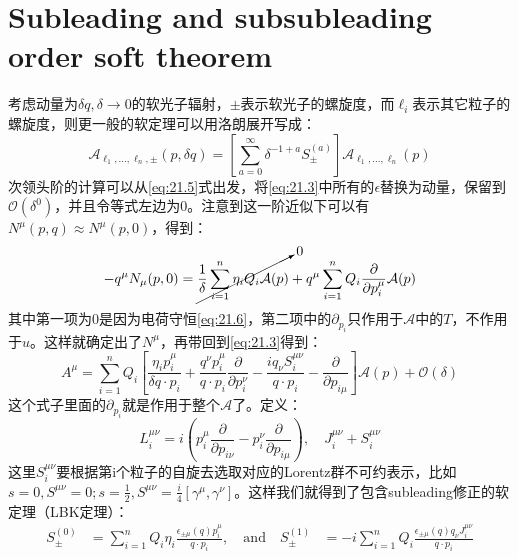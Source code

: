 \section{Subleading and subsubleading order soft theorem}
考虑动量为$\delta q,\delta \to0$的软光子辐射，$\pm$表示软光子的螺旋度，而$\ell_i$表示其它粒子的螺旋度，则更一般的软定理可以用洛朗展开写成：
\begin{equation}
	\mathcal{A}_{\ell_1,...,\ell_n,\pm}(p,\delta q)=\left[\sum_{a=0}^\infty\delta^{-1+a}S_\pm^{(a)}\right]\mathcal{A}_{\ell_1,...,\ell_n}(p)
\end{equation}
次领头阶的计算可以从\ref{eq:21.5}式出发，将\ref{eq:21.3}中所有的$\epsilon$替换为动量，保留到$\mathcal{O}(\delta^0)$，并且令等式左边为0。注意到这一阶近似下可以有$N^\mu(p,q)\approx N^\mu(p,0)$，得到：
\begin{equation}
	-q^{\mu}N_{\mu}(p,0)=\cancelto{0}{\frac{1}{\delta}\sum_{i=1}^{n}\eta_{i}Q_{i}\mathcal{A}(p)}+q^{\mu}\sum_{i=1}^{n}Q_{i}\frac{\partial}{\partial p_{i}^{\mu}}\mathcal{A}(p)
\end{equation}
其中第一项为0是因为电荷守恒\ref{eq:21.6}，第二项中的$\partial_{p_i}$只作用于$\mathcal{A}$中的$T$，不作用于$u$。这样就确定出了$N^\mu$，再带回到\ref{eq:21.3}得到：
\begin{equation}
	A^\mu=\sum_{i=1}^nQ_i\left[\frac{\eta_ip_i^\mu}{\delta q\cdot p_i}+\frac{q^\nu p_i^\mu}{q\cdot p_i}\frac{\partial}{\partial p_i^\nu}-\frac{iq_\nu S_i^{\mu\nu}}{q\cdot p_i}-\frac{\partial}{\partial p_{i\mu}}\right]\mathcal{A}(p)+\mathcal{O}(\delta)
\end{equation}
这个式子里面的$\partial_{p_i}$就是作用于整个$\mathcal{A}$了。定义：
\begin{equation}
	L_i^{\mu\nu}=i\left(p_i^\mu\frac{\partial}{\partial p_{i\nu}}-p_i^\nu\frac{\partial}{\partial p_{i\mu}}\right),\quad J^{\mu\nu}_i+S_i^{\mu\nu}
\end{equation}
这里$S_i^{\mu\nu}$要根据第i个粒子的自旋去选取对应的Lorentz群不可约表示，比如$s=0,S^{\mu\nu}=0;s=\frac{1}{2},S^{\mu\nu}=\frac{i}{4}[\gamma^\mu,\gamma^\nu]$。这样我们就得到了包含subleading修正的软定理（LBK定理\cite{PhysRevLett.20.86,PhysRev.110.974}）：
\begin{equation}
	\begin{aligned}S_{\pm}^{(0)}&=\sum_{i=1}^nQ_i\eta_i\frac{\epsilon_{\pm\mu}(q)p_i^\mu}{q\cdot p_i},\quad\text{and}\quad S_{\pm}^{(1)}&=-i\sum_{i=1}^nQ_i\frac{\epsilon_{\pm\mu}(q)q_\nu J_i^{\mu\nu}}{q\cdot p_i}\end{aligned}
\end{equation}
